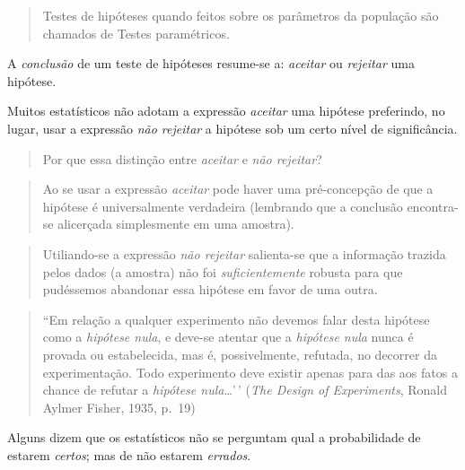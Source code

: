 \documentclass[
]{book}
\begin{document}
\begin{quote}
Testes de hipóteses quando feitos sobre os parâmetros da população são chamados de Testes paramétricos.
\end{quote}

\hfill\break

A \emph{conclusão} de um teste de hipóteses resume-se a: \emph{aceitar} ou \emph{rejeitar} uma hipótese.

\hfill\break

Muitos estatísticos não adotam a expressão \emph{aceitar} uma hipótese preferindo, no lugar, usar a expressão \emph{não rejeitar} a hipótese sob um certo nível de significância.

\hfill\break

\begin{quote}
Por que essa distinção entre \emph{aceitar} e \emph{não rejeitar}?
\end{quote}

\hfill\break

\begin{quote}
Ao se usar a expressão \emph{aceitar} pode haver uma pré-concepção de que a hipótese é universalmente verdadeira (lembrando que a conclusão encontra-se alicerçada simplesmente em uma amostra).
\end{quote}

\hfill\break

\begin{quote}
Utiliando-se a expressão \emph{não rejeitar} salienta-se que a informação trazida pelos dados (a amostra) não foi \emph{suficientemente} robusta para que pudéssemos abandonar essa hipótese em favor de uma outra.
\end{quote}

\hfill\break

\begin{quote}
``Em relação a qualquer experimento não devemos falar desta hipótese como a \emph{hipótese nula}, e deve-se atentar que a \emph{hipótese nula} nunca é provada ou estabelecida, mas é, possivelmente, refutada, no decorrer da experimentação. Todo experimento deve existir apenas para das aos fatos a chance de refutar a \emph{hipótese nula}\ldots'\,' (\emph{The Design of Experiments}, Ronald Aylmer Fisher, 1935, p.~19)
\end{quote}

\hfill\break

Alguns dizem que os estatísticos não se perguntam qual a probabilidade de estarem \emph{certos}; mas de não estarem \emph{errados}.
\end{document}
